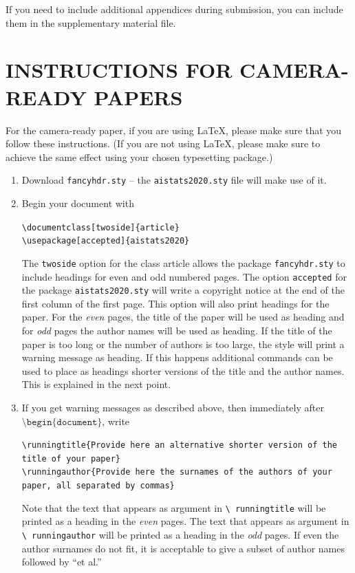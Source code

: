 \documentclass[twoside]{article}
\theoremstyle{plain}
\theoremstyle{definition}
\begin{document}
If you need to include additional appendices during submission, you
can include them in the supplementary material file.



\section{INSTRUCTIONS FOR CAMERA-READY PAPERS}

For the camera-ready paper, if you are using \LaTeX, please make sure
that you follow these instructions.  (If you are not using \LaTeX,
please make sure to achieve the same effect using your chosen
typesetting package.)

\begin{enumerate}
    \item Download \texttt{fancyhdr.sty} -- the
    \texttt{aistats2020.sty} file will make use of it.
    \item Begin your document with
    \begin{flushleft}
    \texttt{\textbackslash documentclass[twoside]\{article\}}\\
    \texttt{\textbackslash usepackage[accepted]\{aistats2020\}}
    \end{flushleft}
    The \texttt{twoside} option for the class article allows the
    package \texttt{fancyhdr.sty} to include headings for even and odd
    numbered pages. The option \texttt{accepted} for the package
    \texttt{aistats2020.sty} will write a copyright notice at the end of
    the first column of the first page. This option will also print
    headings for the paper.  For the \emph{even} pages, the title of
    the paper will be used as heading and for \emph{odd} pages the
    author names will be used as heading.  If the title of the paper
    is too long or the number of authors is too large, the style will
    print a warning message as heading. If this happens additional
    commands can be used to place as headings shorter versions of the
    title and the author names. This is explained in the next point.
    \item  If you get warning messages as described above, then
    immediately after $\texttt{\textbackslash
    begin\{document\}}$, write
    \begin{flushleft}
    \texttt{\textbackslash runningtitle\{Provide here an alternative
    shorter version of the title of your paper\}}\\
    \texttt{\textbackslash runningauthor\{Provide here the surnames of
    the authors of your paper, all separated by commas\}}
    \end{flushleft}
    Note that the text that appears as argument in \texttt{\textbackslash
      runningtitle} will be printed as a heading in the \emph{even}
    pages. The text that appears as argument in \texttt{\textbackslash
      runningauthor} will be printed as a heading in the \emph{odd}
    pages.  If even the author surnames do not fit, it is acceptable
    to give a subset of author names followed by ``et al.''


\end{enumerate}
\end{document}
